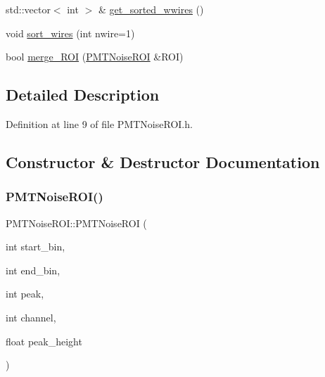 \begin{DoxyCompactItemize}
\item 
std\+::vector$<$ int $>$ \& \hyperlink{class_wire_cell_1_1_sig_proc_1_1_p_m_t_noise_r_o_i_a7031b3d183118e24d277e7c8deb50a1d}{get\+\_\+sorted\+\_\+wwires} ()
\item 
void \hyperlink{class_wire_cell_1_1_sig_proc_1_1_p_m_t_noise_r_o_i_adcf6d65537ca5b9853a3801251f97d8e}{sort\+\_\+wires} (int nwire=1)
\item 
bool \hyperlink{class_wire_cell_1_1_sig_proc_1_1_p_m_t_noise_r_o_i_a4b2640ed0856098cada1ba918b1e53d6}{merge\+\_\+\+R\+OI} (\hyperlink{class_wire_cell_1_1_sig_proc_1_1_p_m_t_noise_r_o_i}{P\+M\+T\+Noise\+R\+OI} \&R\+OI)
\end{DoxyCompactItemize}


\subsection{Detailed Description}


Definition at line 9 of file P\+M\+T\+Noise\+R\+O\+I.\+h.



\subsection{Constructor \& Destructor Documentation}
\mbox{\label{class_wire_cell_1_1_sig_proc_1_1_p_m_t_noise_r_o_i_a86b042170d45fcc2da43e249f266782a}} 
\subsubsection{\texorpdfstring{P\+M\+T\+Noise\+R\+O\+I()}{PMTNoiseROI()}}
{\footnotesize\ttfamily P\+M\+T\+Noise\+R\+O\+I\+::\+P\+M\+T\+Noise\+R\+OI (\begin{DoxyParamCaption}\item[{int}]{start\+\_\+bin,  }\item[{int}]{end\+\_\+bin,  }\item[{int}]{peak,  }\item[{int}]{channel,  }\item[{float}]{peak\+\_\+height }\end{DoxyParamCaption})}



